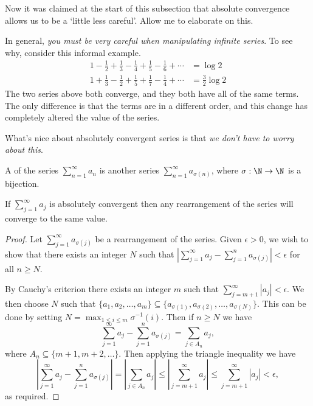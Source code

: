 \documentclass[a4paper]{scrartcl}
\begin{document}
Now it was claimed at the start of this subsection that absolute convergence allows us to be a `little less careful'. Allow me to elaborate on this. 


In general, \emph{\color{red} you must be very careful when manipulating infinite series}. To see why, consider this informal example.
\begin{align*}
	1-\frac{1}{2}+\frac{1}{3}-\frac{1}{4}+\frac{1}{5}-\frac{1}{6}+\cdots &= \log 2 \\
	1+\frac{1}{3}-\frac{1}{2}+\frac{1}{5}+\frac{1}{7}-\frac{1}{4}+\cdots &= \frac{3}{2} \log 2
\end{align*}
The two series above both converge, and they both have all of the same terms. The only difference is that the terms are in a different order, and this change has completely altered the value of the series.

What's nice about absolutely convergent series is that \emph{we don't have to worry about this}.

\begin{definition}[Rearrangement]
	A  of the series $\sum_{n = 1}^{\infty} a_n$ is another series $\sum_{n = 1}^{\infty} a_{\sigma(n)}$, where $\sigma : \N \rightarrow \N$ is a bijection.
\end{definition}

\begin{theorem}
	If $\sum_{j = 1}^{\infty} a_j$ is absolutely convergent then any rearrangement of the series will converge to the same value.
\end{theorem}
\begin{proof}
Let $\sum_{j = 1}^{\infty} a_{\sigma(j)}$ be a rearrangement of the series. Given $\epsilon > 0$, we wish to show that there exists an integer $N$ such that $|\sum_{j = 1}^{\infty} a_j - \sum_{j = 1}^n a_{\sigma(j)}| < \epsilon$ for all $n \geq N$.

By Cauchy's criterion there exists an integer $m$ such that $\sum_{j = m + 1}^{\infty} |a_j| < \epsilon$.
We then choose $N$ such that $\{a_1, a_2, \dots, a_m\} \subseteq \{a_{\sigma(1)}, a_{\sigma(2)}, \dots, a_{\sigma(N)}\}$. This can be done by setting $N = \max_{1 \leq i \leq m} \sigma^{-1}(i)$.
Then if $n \geq N$ we have
$$
\sum_{j = 1}^{\infty} a_j - \sum_{j = 1}^n a_{\sigma(j)} = \sum_{j \in A_n} a_j,
$$
where $A_n \subseteq \{m + 1, m + 2, \dots \}$. 
Then applying the triangle inequality we have
$$
\left|\sum_{j = 1}^{\infty} a_j - \sum_{j = 1}^n a_{\sigma(j)}\right| = \left|\sum_{j \in A_n} a_j\right| \leq \left|\sum_{j = m + 1}^{\infty} a_j \right| \leq \sum_{j = m + 1}^{\infty} |a_j| < \epsilon,
$$
as required.
\end{proof}
\end{document}
